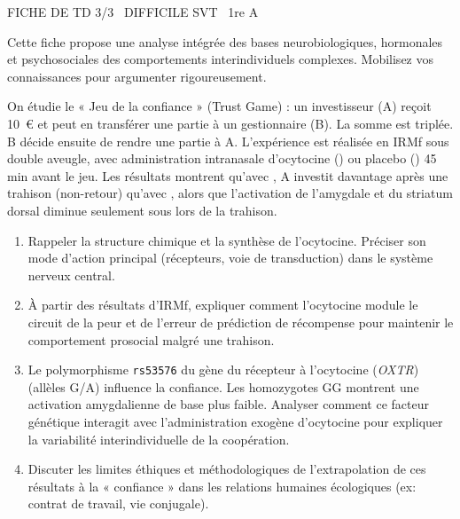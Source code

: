 \documentclass[11pt]{article}
\begin{document}
\begin{tcolorbox}[enhanced,colback=popink,colframe=popink,arc=10pt,boxrule=0pt,left=12pt,right=12pt,top=9pt,bottom=9pt]
{\color{white}\popxbold\small FICHE DE TD 3/3 \textbullet\ DIFFICILE \hfill SVT \textbullet\ 1re A\par}
\end{tcolorbox}
\vspace{4pt}
\noindent Cette fiche propose une analyse intégrée des bases neurobiologiques, hormonales et psychosociales des comportements interindividuels complexes. Mobilisez vos connaissances pour argumenter rigoureusement.

\begin{exercice}
On étudie le « Jeu de la confiance » (Trust Game) : un investisseur (A) reçoit \SI{10}{€} et peut en transférer une partie à un gestionnaire (B). La somme est triplée. B décide ensuite de rendre une partie à A. L'expérience est réalisée en IRMf sous double aveugle, avec administration intranasale d'ocytocine () ou placebo () 45 min avant le jeu. Les résultats montrent qu'avec , A investit davantage après une trahison (non-retour) qu'avec , alors que l'activation de l'amygdale et du striatum dorsal diminue seulement sous  lors de la trahison.
\begin{enumerate}
    \item Rappeler la structure chimique et la synthèse de l'ocytocine. Préciser son mode d'action principal (récepteurs, voie de transduction) dans le système nerveux central.
    \item À partir des résultats d'IRMf, expliquer comment l'ocytocine module le circuit de la peur et de l'erreur de prédiction de récompense pour maintenir le comportement prosocial malgré une trahison.
    \item Le polymorphisme \texttt{rs53576} du gène du récepteur à l'ocytocine (\textit{OXTR}) (allèles G/A) influence la confiance. Les homozygotes GG montrent une activation amygdalienne de base plus faible. Analyser comment ce facteur génétique interagit avec l'administration exogène d'ocytocine pour expliquer la variabilité interindividuelle de la coopération.
    \item Discuter les limites éthiques et méthodologiques de l'extrapolation de ces résultats à la « confiance » dans les relations humaines écologiques (ex: contrat de travail, vie conjugale).
\end{enumerate}
\end{exercice}
\end{document}
